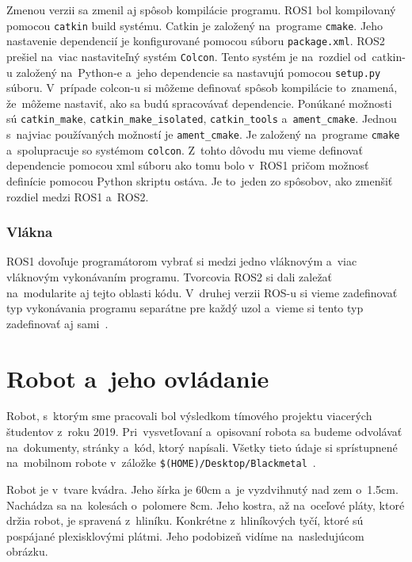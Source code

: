 	Zmenou verzii sa zmenil aj spôsob kompilácie programu. ROS1 bol kompilovaný pomocou \texttt{catkin} build systému. Catkin je založený
	na~programe \texttt{cmake}. Jeho nastavenie dependencií je konfigurované pomocou súboru \texttt{package.xml}. ROS2 prešiel na~viac
	nastaviteľný systém \texttt{Colcon}. Tento systém je na~rozdiel od~catkin-u založený na~Python-e a~jeho dependencie sa nastavujú pomocou
	\texttt{setup.py} súboru. V~prípade colcon-u si môžeme definovať spôsob kompilácie to~znamená, že~môžeme nastaviť, ako sa budú spracovávať
	dependencie. Ponúkané možnosti sú \texttt{catkin\_make}, \texttt{catkin\_make\_isolated}, \texttt{catkin\_tools} a~\texttt{ament\_cmake}.
	Jednou s~najviac používaných možností je \texttt{ament\_cmake}. Je založený na~programe \texttt{cmake} a~spolupracuje so systémom \texttt{colcon}.
	Z~tohto dôvodu mu vieme definovať dependencie pomocou xml súboru ako tomu bolo v~ROS1 pričom možnosť definície pomocou Python skriptu ostáva.
	Je to~jeden zo spôsobov, ako zmenšiť rozdiel medzi ROS1 a~ROS2.

\subsubsection{Vlákna}

	ROS1 dovoľuje programátorom vybrať si medzi jedno vláknovým a~viac vláknovým vykonávaním programu. Tvorcovia ROS2 si dali zaležať na~modularite
	aj tejto oblasti kódu. V~druhej verzii ROS-u si vieme zadefinovať typ vykonávania programu separátne pre každý uzol a~vieme si tento typ
	zadefinovať aj sami~\cite{ROS2design}.

\section{Robot a~jeho ovládanie}

Robot, s~ktorým sme pracovali bol výsledkom tímového projektu viacerých študentov \newline z~roku 2019. Pri~vysvetľovaní a~opisovaní robota sa budeme
odvolávať na~dokumenty, stránky a~kód, ktorý napísali. Všetky tieto údaje si sprístupnené na~mobilnom robote v~záložke
\newline \texttt{\$(HOME)/Desktop/Blackmetal}~\cite{timovyProjekt}.

Robot je v~tvare kvádra. Jeho šírka je 60cm a~je vyzdvihnutý nad zem o~1.5cm. Nachádza sa na~kolesách o~polomere 8cm. Jeho kostra, až na~oceľové pláty,
ktoré držia robot, je spravená z~hliníku. Konkrétne z~hliníkových tyčí, ktoré sú pospájané plexisklovými plátmi. Jeho podobizeň vidíme na~nasledujúcom
obrázku.

